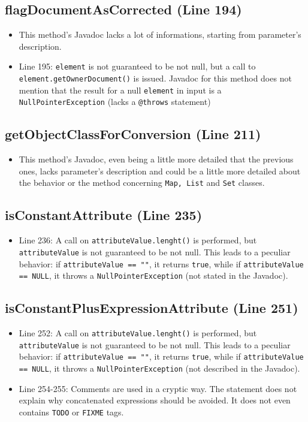 \documentclass[11pt]{article} %
\begin{document}
\subsection{flagDocumentAsCorrected (Line 194)}
\begin{itemize}
	\item This method's Javadoc lacks a lot of informations, starting from parameter's description.
	\item Line 195: \texttt{element} is not guaranteed to be not null, but a call to \texttt{element.getOwnerDocument()} is issued. Javadoc for this method does not mention that the result for a null \texttt{element} in input is a \texttt{NullPointerException} (lacks a \texttt{@throws} statement)
\end{itemize}

\subsection{getObjectClassForConversion (Line 211)}
\begin{itemize}
	\item This method's Javadoc, even being a little more detailed that the previous ones, lacks parameter's description and could be a little more detailed about the behavior or the method concerning \texttt{Map, List} and \texttt{Set} classes.
\end{itemize}

\subsection{isConstantAttribute (Line 235)}
\begin{itemize}
	\item Line 236: A call on \texttt{attributeValue.lenght()} is performed, but \texttt{attributeValue} is not guaranteed to be not null. This leads to a peculiar behavior: if \texttt{attributeValue == ""}, it returns \texttt{true}, while if \texttt{attributeValue == NULL}, it throws a \texttt{NullPointerException} (not stated in the Javadoc).
\end{itemize}

\subsection{isConstantPlusExpressionAttribute (Line 251)}
\begin{itemize}
	\item Line 252: A call on \texttt{attributeValue.lenght()} is performed, but \texttt{attributeValue} is not guaranteed to be not null. This leads to a peculiar behavior: if \texttt{attributeValue == ""}, it returns \texttt{true}, while if \texttt{attributeValue == NULL}, it throws a \texttt{NullPointerException}
 (not described in the Javadoc).
	\item Line 254-255: Comments are used in a cryptic way. The statement does not explain why concatenated expressions should be avoided. It does not even contains \texttt{TODO} or \texttt{FIXME} tags.
\end{itemize}
\end{document}
